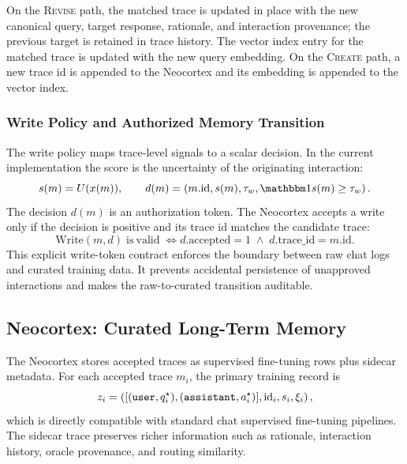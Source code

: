 On the \textsc{Revise} path, the matched trace is updated in place with the new canonical query, target response, rationale, and interaction provenance; the previous target is retained in trace history.
The vector index entry for the matched trace is updated with the new query embedding.
On the \textsc{Create} path, a new trace id is appended to the Neocortex and its embedding is appended to the vector index.

\subsubsection{Write Policy and Authorized Memory Transition}
\label{sec:method:write_policy}

The write policy maps trace-level signals to a scalar decision.
In the current implementation the score is the uncertainty of the originating interaction:
\begin{equation}
  s(m) = U(x(m)),
  \qquad
  d(m)=\left(m.\mathrm{id}, s(m), \tau_w, \indicator{s(m)\ge\tau_w}\right).
  \label{eq:write_decision}
\end{equation}
The decision $d(m)$ is an authorization token.
The Neocortex accepts a write only if the decision is positive and its trace id matches the candidate trace:
\begin{equation}
  \mathrm{Write}(m,d)
  \;\mathrm{is\ valid}\;
  \Longleftrightarrow
  d.\mathrm{accepted}=1
  \;\wedge\;
  d.\mathrm{trace\_id}=m.\mathrm{id}.
  \label{eq:write_token_contract}
\end{equation}
This explicit write-token contract enforces the boundary between raw chat logs and curated training data.
It prevents accidental persistence of unapproved interactions and makes the raw-to-curated transition auditable.

\subsection{Neocortex: Curated Long-Term Memory}
\label{sec:method:neocortex}

The Neocortex stores accepted traces as supervised fine-tuning rows plus sidecar metadata.
For each accepted trace $m_i$, the primary training record is
\begin{equation}
  z_i
  =
  \left(
    [({\tt user}, q_i^{\star}), ({\tt assistant}, a_i^{\star})],
    \mathrm{id}_i,
    s_i,
    \xi_i
  \right),
  \label{eq:sft_row}
\end{equation}
which is directly compatible with standard chat supervised fine-tuning pipelines.
The sidecar trace preserves richer information such as rationale, interaction history, oracle provenance, and routing similarity.


